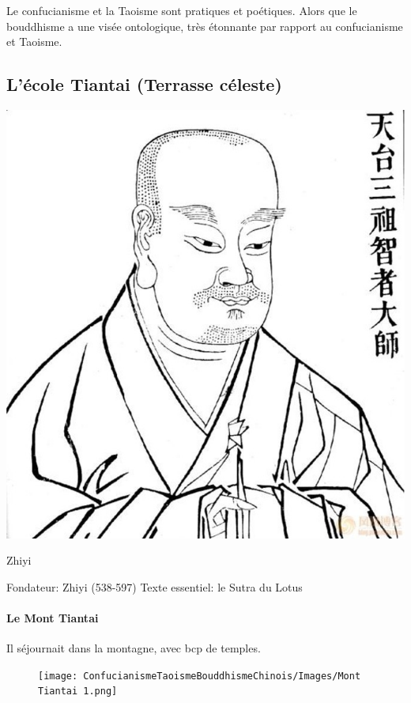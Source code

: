 \begin{Synthesis}
    Le confucianisme et la Taoisme sont pratiques et poétiques. Alors que le bouddhisme a une visée ontologique, très étonnante par rapport au confucianisme et Taoisme.
\end{Synthesis}

\subsection{L’école Tiantai (Terrasse céleste)}

\begin{marginfigure}

    \centering
    \includegraphics[width=\textwidth]{ConfucianismeTaoismeBouddhismeChinois/Images/Zhiyi.jpg}
    \caption{Zhiyi}
    \label{fig:enter-label}
    
\end{marginfigure}



Fondateur: Zhiyi (538-597)
Texte essentiel: le Sutra du Lotus
 
\paragraph{Le Mont Tiantai}
Il séjournait dans la montagne, avec bcp de temples.
\begin{figure}
    \centering
    \texttt{[image: ConfucianismeTaoismeBouddhismeChinois/Images/Mont Tiantai 1.png]}
    

    \label{fig:enter-label}
\end{figure}

